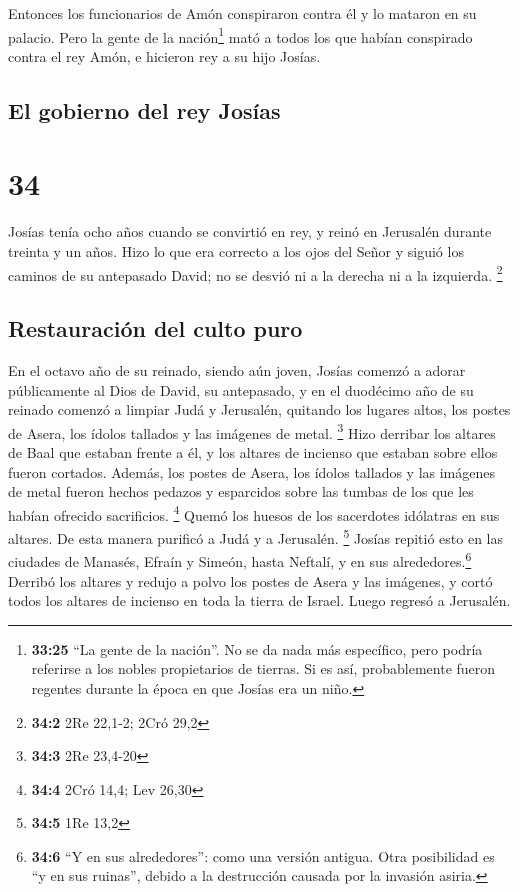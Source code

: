  Entonces los funcionarios de Amón conspiraron contra él
y lo mataron en su palacio.  Pero la gente de la
nación\footnote{\textbf{33:25} ``La gente de la nación''. No se da nada
  más específico, pero podría referirse a los nobles propietarios de
  tierras. Si es así, probablemente fueron regentes durante la época en
  que Josías era un niño.} mató a todos los que habían conspirado contra
el rey Amón, e hicieron rey a su hijo Josías.

\hypertarget{el-gobierno-del-rey-josuxedas}{%
\subsection{El gobierno del rey
Josías}\label{el-gobierno-del-rey-josuxedas}}

\hypertarget{section-33}{%
\section{34}\label{section-33}}

 Josías tenía ocho años cuando se convirtió en rey, y
reinó en Jerusalén durante treinta y un años.  Hizo lo que
era correcto a los ojos del Señor y siguió los caminos de su antepasado
David; no se desvió ni a la derecha ni a la izquierda. \footnote{\textbf{34:2}
  2Re 22,1-2; 2Cró 29,2}

\hypertarget{restauraciuxf3n-del-culto-puro}{%
\subsection{Restauración del culto
puro}\label{restauraciuxf3n-del-culto-puro}}

 En el octavo año de su reinado, siendo aún joven, Josías
comenzó a adorar públicamente al Dios de David, su antepasado, y en el
duodécimo año de su reinado comenzó a limpiar Judá y Jerusalén, quitando
los lugares altos, los postes de Asera, los ídolos tallados y las
imágenes de metal. \footnote{\textbf{34:3} 2Re 23,4-20} 
Hizo derribar los altares de Baal que estaban frente a él, y los altares
de incienso que estaban sobre ellos fueron cortados. Además, los postes
de Asera, los ídolos tallados y las imágenes de metal fueron hechos
pedazos y esparcidos sobre las tumbas de los que les habían ofrecido
sacrificios. \footnote{\textbf{34:4} 2Cró 14,4; Lev 26,30}
 Quemó los huesos de los sacerdotes idólatras en sus
altares. De esta manera purificó a Judá y a Jerusalén. \footnote{\textbf{34:5}
  1Re 13,2}  Josías repitió esto en las ciudades de
Manasés, Efraín y Simeón, hasta Neftalí, y en sus
alrededores.\footnote{\textbf{34:6} ``Y en sus alrededores'': como una
  versión antigua. Otra posibilidad es ``y en sus ruinas'', debido a la
  destrucción causada por la invasión asiria.}  Derribó
los altares y redujo a polvo los postes de Asera y las imágenes, y cortó
todos los altares de incienso en toda la tierra de Israel. Luego regresó
a Jerusalén.

